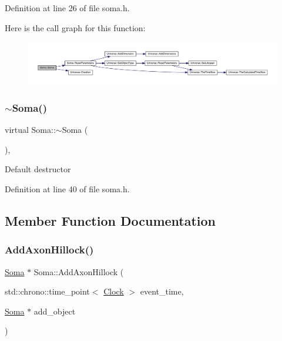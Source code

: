 Definition at line 26 of file soma.\+h.

Here is the call graph for this function\+:\nopagebreak
\begin{figure}[H]
\begin{center}
\leavevmode
\includegraphics[width=350pt]{class_soma_a451e3918aa5f3ec5670fa08d4d710dd6_cgraph}
\end{center}
\end{figure}
\mbox{\label{class_soma_a482570e6b3e366db93396add6ba1922d}} 
\subsubsection{\texorpdfstring{$\sim$\+Soma()}{~Soma()}}
{\footnotesize\ttfamily virtual Soma\+::$\sim$\+Soma (\begin{DoxyParamCaption}{ }\end{DoxyParamCaption})\hspace{0.3cm}{\ttfamily [inline]}, {\ttfamily [virtual]}}

Default destructor 

Definition at line 40 of file soma.\+h.



\subsection{Member Function Documentation}
\mbox{\label{class_soma_a02e0e4656099531b35ab56ad1f7c945a}} 
\subsubsection{\texorpdfstring{Add\+Axon\+Hillock()}{AddAxonHillock()}}
{\footnotesize\ttfamily \mbox{\hyperlink{class_soma}{Soma}} $\ast$ Soma\+::\+Add\+Axon\+Hillock (\begin{DoxyParamCaption}\item[{std\+::chrono\+::time\+\_\+point$<$ \mbox{\hyperlink{universe_8h_a0ef8d951d1ca5ab3cfaf7ab4c7a6fd80}{Clock}} $>$}]{event\+\_\+time,  }\item[{\mbox{\hyperlink{class_soma}{Soma}} $\ast$}]{add\+\_\+object }\end{DoxyParamCaption})}



